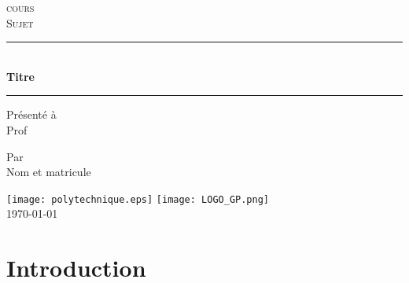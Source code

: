 \documentclass[letterpaper,12pt,oneside]{article}
\newcommand{\HRule}{\rule{\linewidth}{0.5mm}}
\begin{document}

\newcommand{\noms}{Nom et matricule}
\newcommand{\cours}{cours}
\newcommand{\quoi}{Sujet}
\newcommand{\titre}{Titre}
\newcommand{\prof}{Prof}

\begin{titlepage}

\begin{center}

\textsc{\LARGE \cours}
\\[1.5cm]
\textsc{\Large \quoi}\\[0.8cm]

\vfill
\HRule \\[0.4cm]
{ \huge \bfseries \titre}\\[0.1cm]
\HRule

\vfill
 
\Large{Présenté à \\ \prof}\\[2cm]

\vfill

\Large{Par\\ \noms}\\[0.75cm]

\vfill


\texttt{[image: polytechnique.eps]} 
\hspace{1cm}
\texttt{[image: LOGO\_GP.png]}
\\
\today



\end{center}
\end{titlepage}

\newpage
\mbox{}
\thispagestyle{empty}
\newpage

\tableofcontents
\listoffigures
\listoftables

\newpage
\mbox{}
\thispagestyle{empty}
\newpage

\setcounter{page}{1}

\begin{abstract}

\end{abstract}

\section{Introduction}
\end{document}
